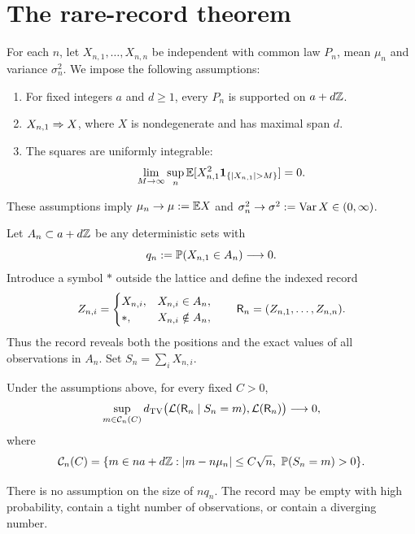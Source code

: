\section{The rare-record theorem}\label{sec:record}
For each $n$, let $X_{n,1},\ldots,X_{n,n}$ be independent with common law $P_n$, mean $\mu_n$ and variance $\sigma_n^2$. We impose the following assumptions:
\begin{enumerate}
 \item For fixed integers $a$ and $d\ge1$, every $P_n$ is supported on $a+d\mathbb Z$.
 \item $X_{n,1}\mathrel{\Rightarrow} X$, where $X$ is nondegenerate and has maximal span $d$.
 \item The squares are uniformly integrable:
 \begin{equation}\label{eq:ui}
 \lim_{M\to\infty}\sup_n\E[X_{n,1}^2\ind_{\{|X_{n,1}|>M\}}]=0.
 \end{equation}
\end{enumerate}
These assumptions imply $\mu_n\to\mu:=\mathbb E X$ and $\sigma_n^2\to\sigma^2:=\operatorname{Var} X\in(0,\infty)$.

Let $A_n\subset a+d\mathbb Z$ be any deterministic sets with
\begin{equation}\label{eq:q}
 q_n:=\mathbb P(X_{n,1}\in A_n)\longrightarrow0.
\end{equation}
Introduce a symbol $*$ outside the lattice and define the indexed record
\begin{equation}\label{eq:record}
 Z_{n,i}=\begin{cases}X_{n,i},&X_{n,i}\in A_n,\\ *,&X_{n,i}\notin A_n,\end{cases}
 \qquad \mathsf R_n=(Z_{n,1},\ldots,Z_{n,n}).
\end{equation}
Thus the record reveals both the positions and the exact values of all observations in $A_n$. Set $S_n=\sum_iX_{n,i}$.

\begin{theorem}\label{thm:rare}
Under the assumptions above, for every fixed $C>0$,
\begin{equation}\label{eq:rare}
 \sup_{m\in\mathcal C_n(C)}
 d_{\mathrm{TV}}\bigl(\mathcal L(\mathsf R_n\mid S_n=m),\mathcal L(\mathsf R_n)\bigr)\longrightarrow0,
\end{equation}
where
\[
 \mathcal C_n(C)=\{m\in na+d\mathbb Z: |m-n\mu_n|\le C\sqrt n,\ \mathbb P(S_n=m)>0\}.
\]
\end{theorem}
There is no assumption on the size of $nq_n$. The record may be empty with high probability, contain a tight number of observations, or contain a diverging number.

